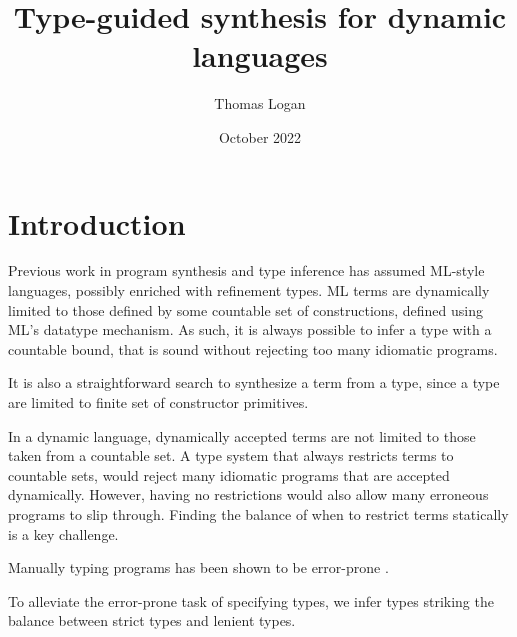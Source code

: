 \documentclass{article}
\title{Type-guided synthesis for dynamic languages}
\author{Thomas Logan}
\date{October 2022}
\begin{document}
\maketitle

\section{Introduction}

Previous work in program synthesis and type inference \cite{} has assumed ML-style languages, 
possibly enriched with refinement types.
ML terms are dynamically limited to those defined by some countable set of constructions, 
defined using ML's datatype mechanism. 
As such, it is always possible to infer a type with a countable bound, 
that is sound without rejecting too many idiomatic programs. 

It is also a straightforward search to synthesize a term from a type, 
since a type are limited to finite set of constructor primitives.  

In a dynamic language, dynamically accepted terms are not limited to those taken 
from a countable set. 
A type system that always restricts terms to countable sets,
would reject many idiomatic programs that are accepted dynamically. 
However, having no restrictions would also allow many erroneous programs to slip through.
Finding the balance of when to restrict terms statically is a key challenge. 

Manually typing programs has been shown to be error-prone \cite{}. %

To alleviate the error-prone task of specifying types, we infer types
striking the balance between strict types and lenient types. 



\end{document}
